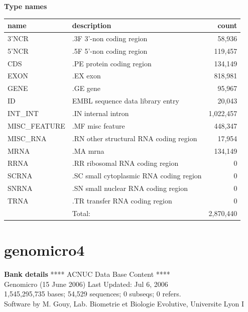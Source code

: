 \documentclass{article}
\begin{document}
\begin{Schunk}
\textbf{Type names}
\noindent\begin{tabular}{llr}
\hline \hline
name & description & count \\
\hline
3'NCR  &  .3F  3'-non coding region  &  58,936 \\
5'NCR  &  .5F  5'-non coding region  &  119,457 \\
CDS  &  .PE protein coding region  &  134,149 \\
EXON  &  .EX exon  &  818,981 \\
GENE  &  .GE gene  &  95,967 \\
ID  &  EMBL sequence data library entry  &  20,043 \\
INT\_INT  &  .IN  internal intron  &  1,022,457 \\
MISC\_FEATURE  &  .MF misc feature  &  448,347 \\
MISC\_RNA  &  .RN other structural RNA coding region  &  17,954 \\
MRNA  &  .MA mrna  &  134,149 \\
RRNA  &  .RR ribosomal RNA coding region  &  0 \\
SCRNA  &  .SC small cytoplasmic RNA coding region  &  0 \\
SNRNA  &  .SN small nuclear RNA coding region  &  0 \\
TRNA  &  .TR transfer RNA coding region  &  0 \\
\hline
 & Total: & 2,870,440 \\
\hline \hline
\end{tabular}

\section{ genomicro4 }
\textbf{Bank details}
             ****     ACNUC Data Base Content      ****                         \\
              Genomicro (15 June 2006) Last Updated: Jul  6, 2006\\
1,545,295,735 bases; 54,529 sequences; 0 subseqs; 0 refers.\\
Software by M. Gouy, Lab. Biometrie et Biologie Evolutive, Universite Lyon I 


\end{Schunk}
\end{document}

